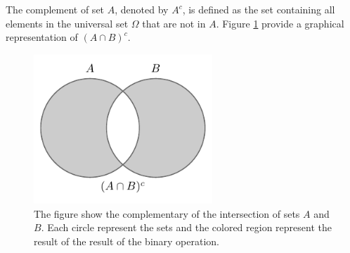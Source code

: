 \begin{definition}[Complementation]
	The complement of set $A$, denoted by $A^c$, is defined as the set containing all elements in the universal set $\Omega$ that are not in $A$. Figure \ref{fig:set_complementation} provide a graphical representation of $(A \cap B)^c$.
	\begin{figure}[H]
		\centering
		\includegraphics[width = 0.6\textwidth]{figures/set_complementary.pdf}
		\caption{The figure show the complementary of the intersection of sets $A$ and $B$. Each circle represent the sets and the colored region represent the result of the result of the binary operation.}
		\label{fig:set_complementation}
	\end{figure}
\end{definition}


